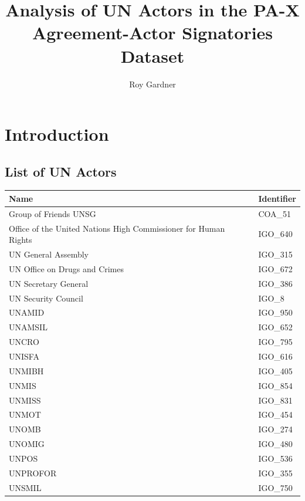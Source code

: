\documentclass{article}
\title{Analysis of UN Actors in the PA-X Agreement-Actor Signatories Dataset}
\author{Roy Gardner}
\begin{document}

\maketitle

\tableofcontents
\newpage

\section{Introduction}

\subsection{List of UN Actors}

\begin{table}[H]
\begin{center}
\small
\begin{tabularx}{\textwidth}{|X|l|}
    \hline
    \textbf{Name} & \textbf{Identifier} \\
    \hline
    \hline
        Group of Friends UNSG & COA\_51 \\
	\hline
	Office of the United Nations High Commissioner for Human Rights & IGO\_640 \\
	\hline
	UN General Assembly & IGO\_315 \\
	\hline
	UN Office on Drugs and Crimes & IGO\_672 \\
	\hline
	UN Secretary General & IGO\_386 \\
	\hline
	UN Security Council & IGO\_8 \\
	\hline
	UNAMID & IGO\_950 \\
	\hline
	UNAMSIL & IGO\_652 \\
	\hline
	UNCRO & IGO\_795 \\
	\hline
	UNISFA & IGO\_616 \\
	\hline
	UNMIBH & IGO\_405 \\
	\hline
	UNMIS & IGO\_854 \\
	\hline
	UNMISS & IGO\_831 \\
	\hline
	UNMOT & IGO\_454 \\
	\hline
	UNOMB & IGO\_274 \\
	\hline
	UNOMIG & IGO\_480 \\
	\hline
	UNPOS & IGO\_536 \\
	\hline
	UNPROFOR & IGO\_355 \\
	\hline
	UNSMIL & IGO\_750 \\
	\hline

\end{tabularx}
\end{center}
\end{table}
\end{document}

